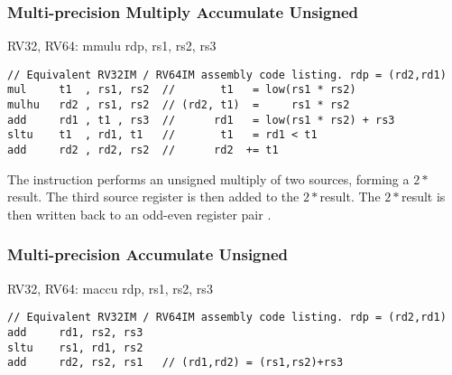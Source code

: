 

\subsubsection{Multi-precision Multiply Accumulate Unsigned}

\begin{isa}
RV32, RV64:
    mmulu   rdp, rs1, rs2, rs3
\end{isa}

\begin{lstlisting}[]
// Equivalent RV32IM / RV64IM assembly code listing. rdp = (rd2,rd1)
mul     t1  , rs1, rs2  //       t1   = low(rs1 * rs2)
mulhu   rd2 , rs1, rs2  // (rd2, t1)  =     rs1 * rs2
add     rd1 , t1 , rs3  //      rd1   = low(rs1 * rs2) + rs3
sltu    t1  , rd1, t1   //       t1   = rd1 < t1
add     rd2 , rd2, rs2  //      rd2  += t1
\end{lstlisting}

The  instruction performs an unsigned multiply
of two \XLEN sources, forming a $2*$\XLEN result.
The third \XLEN source register is then added to the $2*$\XLEN result.
The $2*$\XLEN result is then written back to an odd-even register
pair \rdp.


\subsubsection{Multi-precision Accumulate Unsigned}

\begin{isa}
RV32, RV64:
    maccu   rdp, rs1, rs2, rs3
\end{isa}

\begin{lstlisting}[]
// Equivalent RV32IM / RV64IM assembly code listing. rdp = (rd2,rd1)
add     rd1, rs2, rs3
sltu    rs1, rd1, rs2
add     rd2, rs2, rs1   // (rd1,rd2) = (rs1,rs2)+rs3
\end{lstlisting}

